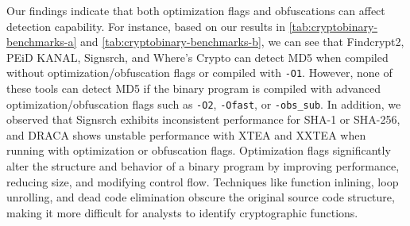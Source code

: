 Our findings indicate that both optimization flags and obfuscations can affect detection capability. For instance, based on our results in \autoref{tab:cryptobinary-benchmarks-a} and \autoref{tab:cryptobinary-benchmarks-b}, we can see that Findcrypt2, PEiD KANAL, Signsrch, and Where's Crypto can detect MD5 when compiled without optimization/obfuscation flags or compiled with \texttt{-O1}. However, none of these tools can detect MD5 if the binary program is compiled with advanced optimization/obfuscation flags such as \texttt{-O2}, \texttt{-Ofast}, or \texttt{-obs\_sub}. In addition, we observed that Signsrch exhibits inconsistent performance for SHA-1 or SHA-256, and DRACA shows unstable performance with XTEA and XXTEA when running with optimization or obfuscation flags.
Optimization flags significantly alter the structure and behavior of a binary program by improving performance, reducing size, and modifying control flow. Techniques like function inlining, loop unrolling, and dead code elimination obscure the original source code structure, making it more difficult for analysts to identify cryptographic functions.

